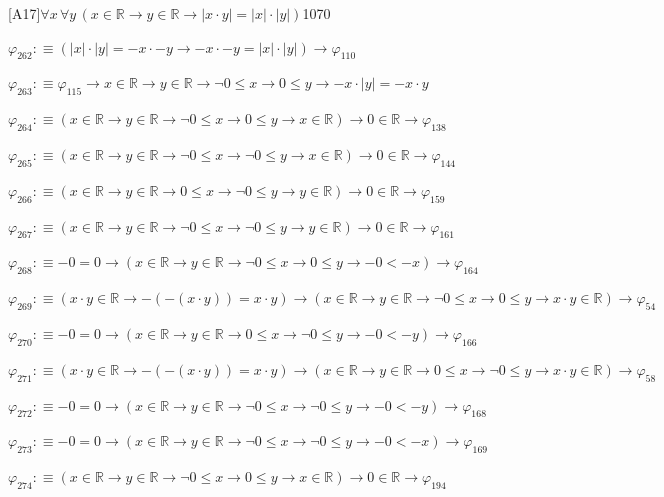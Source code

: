 \begin{fullproof}{[A17]}{$\forall x\,\forall y\,(x \in \mathbb{R} \to y \in \mathbb{R} \to \lvert x \cdot y \rvert = \lvert x \rvert \cdot \lvert y \rvert)$}{1070}
\begin{abbrevlist}
\item $\varphi_{262} :\equiv (\lvert x \rvert \cdot \lvert y \rvert = -x \cdot -y \to -x \cdot -y = \lvert x \rvert \cdot \lvert y \rvert) \to \varphi_{110}$
\item $\varphi_{263} :\equiv \varphi_{115} \to x \in \mathbb{R} \to y \in \mathbb{R} \to \neg 0 \leq x \to 0 \leq y \to -x \cdot \lvert y \rvert = -x \cdot y$
\item $\varphi_{264} :\equiv (x \in \mathbb{R} \to y \in \mathbb{R} \to \neg 0 \leq x \to 0 \leq y \to x \in \mathbb{R}) \to 0 \in \mathbb{R} \to \varphi_{138}$
\item $\varphi_{265} :\equiv (x \in \mathbb{R} \to y \in \mathbb{R} \to \neg 0 \leq x \to \neg 0 \leq y \to x \in \mathbb{R}) \to 0 \in \mathbb{R} \to \varphi_{144}$
\item $\varphi_{266} :\equiv (x \in \mathbb{R} \to y \in \mathbb{R} \to 0 \leq x \to \neg 0 \leq y \to y \in \mathbb{R}) \to 0 \in \mathbb{R} \to \varphi_{159}$
\item $\varphi_{267} :\equiv (x \in \mathbb{R} \to y \in \mathbb{R} \to \neg 0 \leq x \to \neg 0 \leq y \to y \in \mathbb{R}) \to 0 \in \mathbb{R} \to \varphi_{161}$
\item $\varphi_{268} :\equiv -0 = 0 \to (x \in \mathbb{R} \to y \in \mathbb{R} \to \neg 0 \leq x \to 0 \leq y \to -0 < -x) \to \varphi_{164}$
\item $\varphi_{269} :\equiv (x \cdot y \in \mathbb{R} \to -(-(x \cdot y)) = x \cdot y) \to (x \in \mathbb{R} \to y \in \mathbb{R} \to \neg 0 \leq x \to 0 \leq y \to x \cdot y \in \mathbb{R}) \to \varphi_{54}$
\item $\varphi_{270} :\equiv -0 = 0 \to (x \in \mathbb{R} \to y \in \mathbb{R} \to 0 \leq x \to \neg 0 \leq y \to -0 < -y) \to \varphi_{166}$
\item $\varphi_{271} :\equiv (x \cdot y \in \mathbb{R} \to -(-(x \cdot y)) = x \cdot y) \to (x \in \mathbb{R} \to y \in \mathbb{R} \to 0 \leq x \to \neg 0 \leq y \to x \cdot y \in \mathbb{R}) \to \varphi_{58}$
\item $\varphi_{272} :\equiv -0 = 0 \to (x \in \mathbb{R} \to y \in \mathbb{R} \to \neg 0 \leq x \to \neg 0 \leq y \to -0 < -y) \to \varphi_{168}$
\item $\varphi_{273} :\equiv -0 = 0 \to (x \in \mathbb{R} \to y \in \mathbb{R} \to \neg 0 \leq x \to \neg 0 \leq y \to -0 < -x) \to \varphi_{169}$
\item $\varphi_{274} :\equiv (x \in \mathbb{R} \to y \in \mathbb{R} \to \neg 0 \leq x \to 0 \leq y \to x \in \mathbb{R}) \to 0 \in \mathbb{R} \to \varphi_{194}$

\end{abbrevlist}
\end{fullproof}
